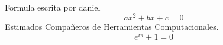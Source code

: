 
Formula escrita por daniel
$$
ax^2+bx+c=0
$$
Estimados Compañeros de Herramientas Computacionales. 
$$
e^{i\pi} + 1 = 0 
$$